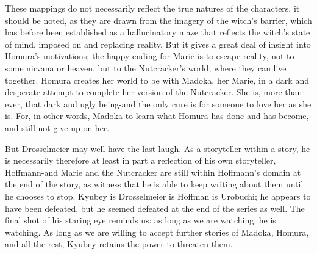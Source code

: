 These mappings do not necessarily reflect the true natures of the characters, it should be noted, as they are drawn from the imagery of the witch's barrier, which has before been established as a hallucinatory maze that reflects the witch's state of mind, imposed on and replacing reality. But it gives a great deal of insight into Homura's motivations; the happy ending for Marie is to escape reality, not to some nirvana or heaven, but to the Nutcracker's world, where they can live together. Homura creates her world to be with Madoka, her Marie, in a dark and desperate attempt to complete her version of the Nutcracker. She is, more than ever, that dark and ugly being-and the only cure is for someone to love her as she is. For, in other words, Madoka to learn what Homura has done and has become, and still not give up on her.

But Drosselmeier may well have the last laugh. As a storyteller within a story, he is necessarily therefore at least in part a reflection of his own storyteller, Hoffmann-and Marie and the Nutcracker are still within Hoffmann's domain at the end of the story, as witness that he is able to keep writing about them until he chooses to stop. Kyubey is Drosselmeier is Hoffman is Urobuchi; he appears to have been defeated, but he seemed defeated at the end of the series as well. The final shot of his staring eye reminds us: as long as we are watching, he is watching. As long as we are willing to accept further stories of Madoka, Homura, and all the rest, Kyubey retains the power to threaten them.
